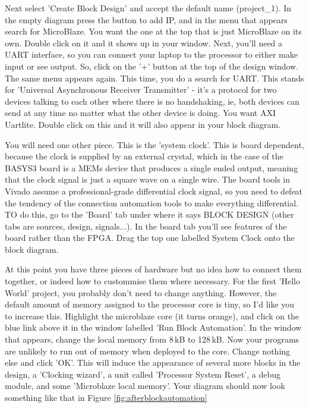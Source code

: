 \documentclass[../physical_computing.tex]{subfiles}
\begin{document}
Next select 'Create Block Design' and accept the default name (project\_1). In the empty diagram press the button to add IP, and in the 
menu that appears search for MicroBlaze. You want the one at the top that is just MicroBlaze on its own. Double click on it and it shows
up in your window. Next, you'll need a UART interface, so you can connect your laptop to the processor to either make input or see output.
So, click on the '+' button at the top of the design window. The same menu appears again. This time, you do a search for UART. This stands
for 'Universal Asynchronous Receiver Transmitter' - it's a protocol for two devices talking to each other where there is no handshaking, ie,
both devices can send at any time no matter what the other device is doing. You want AXI Uartlite. Double click on this and it will also
appear in your block diagram.

You will need one other piece. This is the 'system clock'. This is board dependent, because the clock is supplied by an external crystal,
which in the case of the BASYS3 board is a MEMs device that produces a single ended output, meaning that the clock signal is just a square
wave on a single wire. The board tools in Vivado assume a professional-grade differential clock signal, so you need to defeat the tendency 
of the connection automation tools to make everything differential. TO do this, go to the 'Board' tab under where it says BLOCK DESIGN
(other tabs are sources, design, signals...). In the board tab you'll see features of the board rather than the FPGA. Drag the top one 
labelled System Clock onto the block diagram.

At this point you have three pieces of hardware but no idea how to connect them together, or indeed how to custommise them where necessary.
For the first 'Hello World' project, you probably don't need to change anything. However, the default amount of memory assigned to the 
processor core is tiny, so I'd like you to increase this. Highlight the microblaze core (it turns orange), and click on the blue link 
above it in the window labelled 'Run Block Automation'. In the window that appears, change the local memory from {\rm 8\,kB} to {\rm 128\,kB}.
Now your programs are unlikely to run out of memory when deployed to the core. Change nothing else and click 'OK'. This will induce the
appearance of several more blocks in the design, a 'Clocking wizard', a unit called 'Processor System Reset', a debug module, and
some 'Microblaze local memory'. Your diagram should now look something like that in Figure \ref{fig:afterblockautomation}
\end{document}
